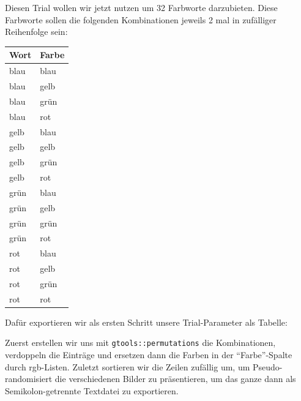 \documentclass[
]{book}
\begin{document}
Diesen Trial wollen wir jetzt nutzen um 32 Farbworte darzubieten.
Diese Farbworte sollen die folgenden Kombinationen jeweils 2 mal in zufälliger Reihenfolge sein:

\begin{table}
\centering
\begin{tabular}[t]{ll}
\toprule
Wort & Farbe\\
\midrule
blau & blau\\
blau & gelb\\
blau & grün\\
blau & rot\\
gelb & blau\\
\addlinespace
gelb & gelb\\
gelb & grün\\
gelb & rot\\
grün & blau\\
grün & gelb\\
\addlinespace
grün & grün\\
grün & rot\\
rot & blau\\
rot & gelb\\
rot & grün\\
\addlinespace
rot & rot\\
\bottomrule
\end{tabular}
\end{table}

Dafür exportieren wir als ersten Schritt unsere Trial-Parameter als Tabelle:

Zuerst erstellen wir uns mit \texttt{gtools::permutations} die Kombinationen, verdoppeln die Einträge und ersetzen dann die Farben in der ``Farbe''-Spalte durch rgb-Listen. Zuletzt sortieren wir die Zeilen zufällig um, um Pseudo-randomisiert die verschiedenen Bilder zu präsentieren, um das ganze dann als Semikolon-getrennte Textdatei zu exportieren.
\end{document}
